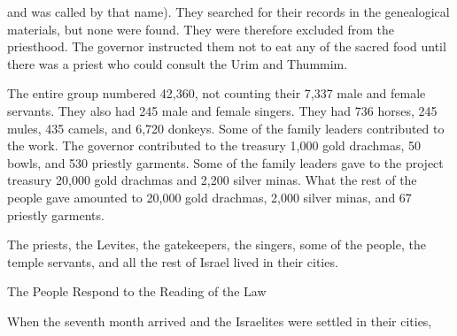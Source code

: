 {and was called
by that name).
They
searched
for their records
in the genealogical materials,
but none
were found.
They were therefore excluded
from
the priesthood.
The governor
instructed
them not
to eat
any of the sacred
food until
there
was a priest
who could consult
the Urim
and Thummim.
\par }{\PP {}The entire group
numbered 42,360,
not counting
their 7,337
male
and female
servants.
They also had 245
male
and female
singers.
They had 736 horses, 245 mules,
435
camels,
and 6,720
donkeys.
Some
of the family
leaders
contributed
to the work.
The governor
contributed
to the treasury
1,000
gold
drachmas,
50
bowls,
and 530
priestly
garments.
Some of the family
leaders
gave
to the project
treasury
20,000
gold
drachmas
and 2,200
silver
minas.
What
the rest
of the people
gave
amounted to 20,000
gold
drachmas,
2,000
silver
minas,
and 67
priestly
garments.
\par }{\PP {}The priests,
the Levites,
the gatekeepers,
the singers,
some
of the people,
the temple servants,
and all
the rest of Israel
lived in
their cities.
\par }{\SH The People Respond to the Reading of the Law
\par }{\PP When
the seventh
month
arrived
and the Israelites
were settled
in their cities,

}
